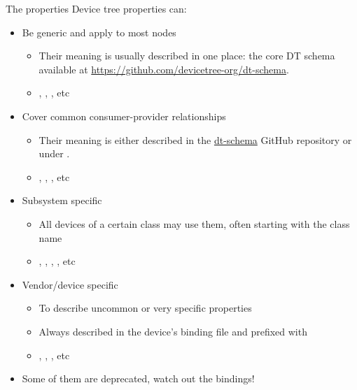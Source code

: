 \begin{frame}[fragile]{The properties}
  Device tree properties can:
  \begin{itemize}
  \item Be generic and apply to most nodes
    \begin{itemize}
    \item Their meaning is usually described in one place: the core DT
      schema available at \url{https://github.com/devicetree-org/dt-schema}.
    \item {}, ,
      {}, etc
    \end{itemize}
  \item Cover common consumer-provider relationships
    \begin{itemize}
    \item Their meaning is either described in the
      \href{https://github.com/devicetree-org/dt-schema}{dt-schema}
      GitHub repository or under .
    \item {}, , , etc
    \end{itemize}
  \item Subsystem specific
    \begin{itemize}
    \item All devices of a certain class may use them, often starting
      with the class name
    \item {}, , ,
      , etc
    \end{itemize}
  \item Vendor/device specific
    \begin{itemize}
    \item To describe uncommon or very specific properties
    \item Always described in the device's binding file and prefixed with 
    \item {}, , , etc
    \end{itemize}
  \item Some of them are deprecated, watch out the bindings!
  \end{itemize}
\end{frame}

